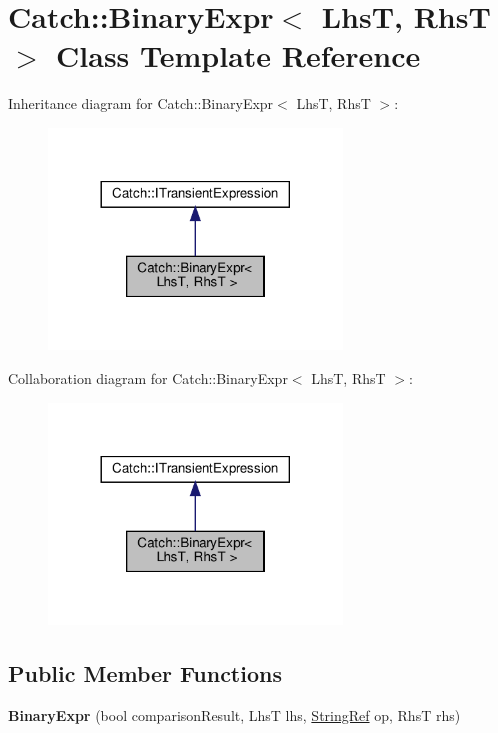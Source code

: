 \hypertarget{classCatch_1_1BinaryExpr}{}\section{Catch\+::Binary\+Expr$<$ LhsT, RhsT $>$ Class Template Reference}
\label{classCatch_1_1BinaryExpr}


Inheritance diagram for Catch\+::Binary\+Expr$<$ LhsT, RhsT $>$\+:
\nopagebreak
\begin{figure}[H]
\begin{center}
\leavevmode
\includegraphics[width=221pt]{classCatch_1_1BinaryExpr__inherit__graph}
\end{center}
\end{figure}


Collaboration diagram for Catch\+::Binary\+Expr$<$ LhsT, RhsT $>$\+:
\nopagebreak
\begin{figure}[H]
\begin{center}
\leavevmode
\includegraphics[width=221pt]{classCatch_1_1BinaryExpr__coll__graph}
\end{center}
\end{figure}
\subsection*{Public Member Functions}
\begin{DoxyCompactItemize}
\item 
\mbox{\label{classCatch_1_1BinaryExpr_a657d66346aef97a760c22776fe6008b6}} 
{\bfseries Binary\+Expr} (bool comparison\+Result, LhsT lhs, \mbox{\hyperlink{classCatch_1_1StringRef}{String\+Ref}} op, RhsT rhs)
\end{DoxyCompactItemize}
